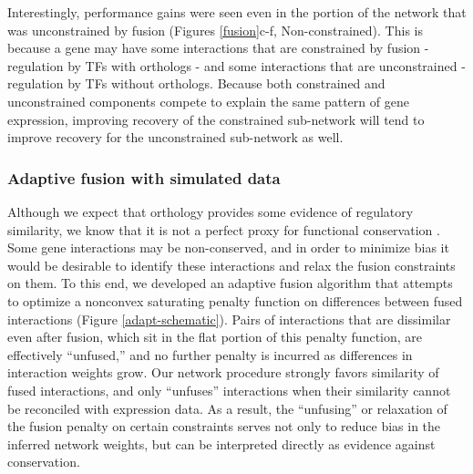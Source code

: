 \documentclass[11pt]{article}
\begin{document}
Interestingly, performance gains were seen even in the portion of the network that was unconstrained by fusion (Figures \ref{fusion}c-f, Non-constrained). This is because a gene may have some interactions that are constrained by fusion - regulation by TFs with orthologs - and some interactions that are unconstrained - regulation by TFs without orthologs. Because both constrained and unconstrained components compete to explain the same pattern of gene expression, improving recovery of the constrained sub-network will tend to improve recovery for the unconstrained sub-network as well.


\subsubsection{Adaptive fusion with simulated data}
Although we expect that orthology provides some evidence of regulatory similarity, we know that it is not a perfect proxy for functional conservation \cite{gabaldon_functional_2013, studer_how_2009, nehrt_testing_2011}. Some gene interactions may be non-conserved, and in order to minimize bias it would be desirable to identify these interactions and relax the fusion constraints on them. To this end, we developed an adaptive fusion algorithm that attempts to optimize a nonconvex saturating penalty function on differences between fused interactions (Figure \ref{adapt-schematic}). Pairs of interactions that are dissimilar even after fusion, which sit in the flat portion of this penalty function, are effectively ``unfused,'' and no further penalty is incurred as differences in interaction weights grow. Our network procedure strongly favors similarity of fused interactions, and only ``unfuses'' interactions when their similarity cannot be reconciled with expression data. As a result, the ``unfusing'' or relaxation of the fusion penalty on certain constraints serves not only to reduce bias in the inferred network weights, but can be interpreted directly as evidence against conservation.
\end{document}
